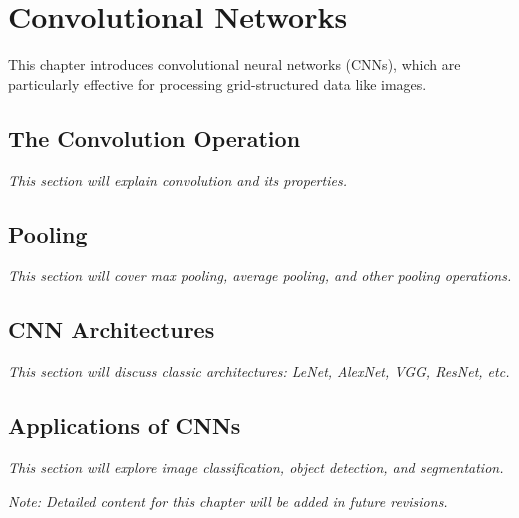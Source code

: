 
\chapter{Convolutional Networks}
\label{chap:convolutional-networks}

This chapter introduces convolutional neural networks (CNNs), which are particularly effective for processing grid-structured data like images.

\section{The Convolution Operation}

\textit{This section will explain convolution and its properties.}

\section{Pooling}

\textit{This section will cover max pooling, average pooling, and other pooling operations.}

\section{CNN Architectures}

\textit{This section will discuss classic architectures: LeNet, AlexNet, VGG, ResNet, etc.}

\section{Applications of CNNs}

\textit{This section will explore image classification, object detection, and segmentation.}

\vspace{1em}
\noindent\textit{Note: Detailed content for this chapter will be added in future revisions.}
